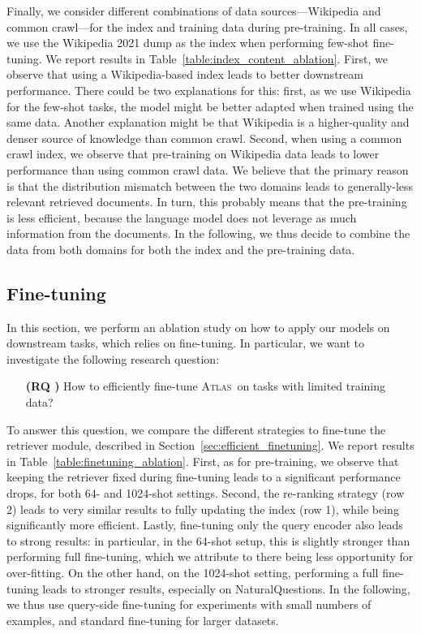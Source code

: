 \documentclass[10pt]{article} \usepackage[preprint]{tmlr}
\newcommand{\Atlas}{\textsc{Atlas}}
\newcounter{rqcounter}
\newcommand{\RQ}{\stepcounter{rqcounter} \textbf{(RQ \arabic{rqcounter})}}
\begin{document}
Finally, we consider different combinations of data sources---Wikipedia and common crawl---for the index and training data during pre-training.
In all cases, we use the Wikipedia 2021 dump as the index when performing few-shot fine-tuning.
We report results in Table~\ref{table:index_content_ablation}.
First, we observe that using a Wikipedia-based index leads to better downstream performance.
There could be two explanations for this: first, as we use Wikipedia for the few-shot tasks, the model might be better adapted when trained using the same data.
Another explanation might be that Wikipedia is a higher-quality and denser source of knowledge than common crawl.
Second, when using a common crawl index, we observe that pre-training on Wikipedia data leads to lower performance than using common crawl data.
We believe that the primary reason is that the distribution mismatch between the two domains leads to generally-less relevant retrieved documents.
In turn, this probably means that the pre-training is less efficient, because the language model does not leverage as much information from the documents.
In the following, we thus decide to combine the data from both domains for both the index and the pre-training data.

\subsection{Fine-tuning}
\label{sec:finetuning}
In this section, we perform an ablation study on how to apply our models on downstream tasks, which relies on fine-tuning.
In particular, we want to investigate the following research question:
\begin{itemize}[leftmargin=5em]
\item[\RQ] How to efficiently fine-tune \Atlas~on tasks with limited training data?
\end{itemize}
To answer this question, we compare the different strategies to fine-tune the retriever module, described in Section~\ref{sec:efficient_finetuning}.
We report results in Table~\ref{table:finetuning_ablation}.
First, as for pre-training, we observe that keeping the retriever fixed during fine-tuning leads to a significant performance drops, for both 64- and 1024-shot settings.
Second, the re-ranking strategy (row 2) leads to very similar results to fully updating the index (row 1), while being significantly more efficient.
Lastly, fine-tuning only the query encoder also leads to strong results: in particular, in the 64-shot setup, this is slightly stronger than performing full fine-tuning, which we attribute to there being less opportunity for over-fitting.
On the other hand, on the 1024-shot setting, performing a full fine-tuning leads to stronger results, especially on NaturalQuestions.
In the following, we thus use query-side fine-tuning for experiments with small numbers of examples, and  standard fine-tuning for larger datasets.
\end{document}
